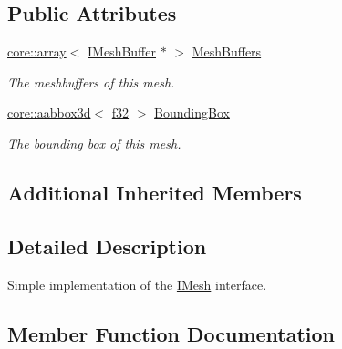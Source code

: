 \subsection*{Public Attributes}
\begin{DoxyCompactItemize}
\item 
\mbox{\label{structirr_1_1scene_1_1SMesh_ad7b37c4de22b8ab520e310c01cea637c}} 
\hyperlink{classirr_1_1core_1_1array}{core\+::array}$<$ \hyperlink{classirr_1_1scene_1_1IMeshBuffer}{I\+Mesh\+Buffer} $\ast$ $>$ \hyperlink{structirr_1_1scene_1_1SMesh_ad7b37c4de22b8ab520e310c01cea637c}{Mesh\+Buffers}
\begin{DoxyCompactList}\small\item\em The meshbuffers of this mesh. \end{DoxyCompactList}\item 
\mbox{\label{structirr_1_1scene_1_1SMesh_ac984f3a50af351326e81474aef667c7c}} 
\hyperlink{classirr_1_1core_1_1aabbox3d}{core\+::aabbox3d}$<$ \hyperlink{namespaceirr_a0277be98d67dc26ff93b1a6a1d086b07}{f32} $>$ \hyperlink{structirr_1_1scene_1_1SMesh_ac984f3a50af351326e81474aef667c7c}{Bounding\+Box}
\begin{DoxyCompactList}\small\item\em The bounding box of this mesh. \end{DoxyCompactList}\end{DoxyCompactItemize}
\subsection*{Additional Inherited Members}


\subsection{Detailed Description}
Simple implementation of the \hyperlink{classirr_1_1scene_1_1IMesh}{I\+Mesh} interface. 

\subsection{Member Function Documentation}
\mbox{\label{structirr_1_1scene_1_1SMesh_a890e7506262b2ebaf45ff95c681452bd}} 
